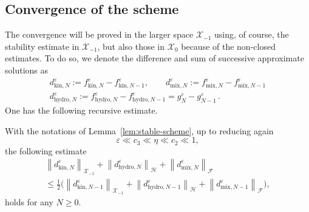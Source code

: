 \documentclass[AHL,Unicode,longabstracts,published]{cedram}
\newcommand{\hyd}{\mathrm{hydro}}
\newcommand{\mix}{\mathrm{mix}}
\newcommand{\kin}{\mathrm{kin}}
\newcommand{\FFF}{\mathscr{F}}
\newcommand{\HHH}{\mathscr{H}}
\newcommand{\GGG}{\mathscr{X}}
\newcommand{\SSSs}{\HHH}
\newcommand{\SSSh}{\pmb{\GGG}}
\newcommand{\SSSm}{\FFF}
\renewcommand*\le{\leqslant}
\renewcommand*\ge{\geqslant}
\newcommand*\eps{{\varepsilon}}
\begin{document}
\subsection{Convergence of the scheme}

The convergence will be proved in the larger space $\SSSh_{-1}$ using, of course, the stability estimate in $\SSSh_{-1} $, but also those in $\SSSh_0$ because of the non-closed estimates. To do so, we denote the difference and sum of successive approximate solutions as
\begin{gather*}
d^\eps_{\kin, N} := f^\eps_{\kin, N} - f^\eps_{\kin, N-1}, \qquad d^\eps_{\mix, N} := f^\eps_{\mix, N} - f^\eps_{\mix, N-1}\\
d^\eps_{\hyd, N} := f^\eps_{\hyd, N} - f^\eps_{\hyd, N-1} = g^\eps_N - g^\eps_{N-1}\,.
\end{gather*}
One has the following recursive estimate.

\begin{prop}
With the notations of Lemma~\ref{lem:stable-scheme}, up to reducing again
\[
\eps \ll c_3 \ll \eta \ll c_2 \ll 1,
\]
the following estimate
\begin{multline*}
\left\| d^\eps_{\kin, N} \right\|_{ \SSSh_{-1}} + 
\left\| d^\eps_{\hyd, N} \right\|_{ \SSSs } + \left\| d^\eps_{\mix, N} \right\|_{ \SSSm } \\
\le \frac{1}{2} \Bigg(\left\| d^\eps_{\kin, N-1} \right\|_{\SSSh_{-1}} + \left\| d^\eps_{\hyd, N-1}\right\|_{\SSSs} + \left\| d^\eps_{\mix, N-1}\right\|_{\SSSm}\Bigg),
\end{multline*}
holds for any $N\ge0.$
\end{prop}
\end{document}
